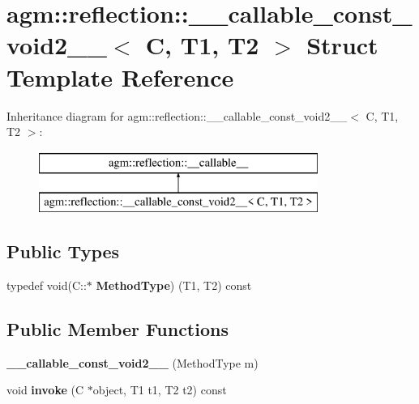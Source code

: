 \hypertarget{structagm_1_1reflection_1_1____callable__const__void2____}{}\section{agm\+:\+:reflection\+:\+:\+\_\+\+\_\+callable\+\_\+const\+\_\+void2\+\_\+\+\_\+$<$ C, T1, T2 $>$ Struct Template Reference}
\label{structagm_1_1reflection_1_1____callable__const__void2____}
Inheritance diagram for agm\+:\+:reflection\+:\+:\+\_\+\+\_\+callable\+\_\+const\+\_\+void2\+\_\+\+\_\+$<$ C, T1, T2 $>$\+:\begin{figure}[H]
\begin{center}
\leavevmode
\includegraphics[height=2.000000cm]{structagm_1_1reflection_1_1____callable__const__void2____}
\end{center}
\end{figure}
\subsection*{Public Types}
\begin{DoxyCompactItemize}
\item 
typedef void(C\+::$\ast$ {\bfseries Method\+Type}) (T1, T2) const \hypertarget{structagm_1_1reflection_1_1____callable__const__void2_____a49488c42b71609796cde2a26e60c1a33}{}\label{structagm_1_1reflection_1_1____callable__const__void2_____a49488c42b71609796cde2a26e60c1a33}

\end{DoxyCompactItemize}
\subsection*{Public Member Functions}
\begin{DoxyCompactItemize}
\item 
{\bfseries \+\_\+\+\_\+callable\+\_\+const\+\_\+void2\+\_\+\+\_\+} (Method\+Type m)\hypertarget{structagm_1_1reflection_1_1____callable__const__void2_____ae53d2236f518e16edbc623ef8dac87ca}{}\label{structagm_1_1reflection_1_1____callable__const__void2_____ae53d2236f518e16edbc623ef8dac87ca}

\item 
void {\bfseries invoke} (C $\ast$object, T1 t1, T2 t2) const \hypertarget{structagm_1_1reflection_1_1____callable__const__void2_____a5cab234dbbf95ada4320d9bb85dfe4cf}{}\label{structagm_1_1reflection_1_1____callable__const__void2_____a5cab234dbbf95ada4320d9bb85dfe4cf}

\end{DoxyCompactItemize}
